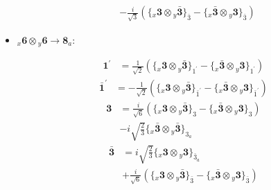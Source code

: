 \documentclass[english]{article}
\newcommand{\rep}[1]{\mathbf{#1}}
\newcommand{\repx}[2]{{}_{#2}\mathbf{#1}}
\newcommand{\tsprodx}[2]{\repx{#1}{x}\otimes\repx{#2}{y}}
\newcommand{\subcgt}[3]{\big\{ \tsprodx{#1}{#2}\big\}^{}_{#3}}
\begin{document}
\begin{itemize}
\begin{fleqn}
\begin{align*}
 & -\frac{i}{\sqrt{3}}\left(\subcgt{3}{\bar{3}}{\bar{3}}-\subcgt{\bar{3}}{3}{\bar{3}}\right)
\end{align*}
\end{fleqn}
\item $\tsprodx{6}{6}\to\rep{8}_{a}$:
\begin{fleqn}
\begin{align*}
\rep{1^{\prime}} & = \frac{1}{\sqrt{2}}\left(\subcgt{3}{\bar{3}}{1^{\prime}}-\subcgt{\bar{3}}{3}{1^{\prime}}\right)
\end{align*}
\begin{align*}
\rep{\bar{1}^{\prime}} & = -\frac{1}{\sqrt{2}}\left(\subcgt{3}{\bar{3}}{\bar{1}^{\prime}}-\subcgt{\bar{3}}{3}{\bar{1}^{\prime}}\right)
\end{align*}
\begin{align*}
\rep{3} & = \frac{i}{\sqrt{6}}\left(\subcgt{3}{\bar{3}}{3}-\subcgt{\bar{3}}{3}{3}\right) \\ 
 & -i \sqrt{\frac{2}{3}}\subcgt{\bar{3}}{\bar{3}}{3_{a}}
\end{align*}
\begin{align*}
\rep{\bar{3}} & = i \sqrt{\frac{2}{3}}\subcgt{3}{3}{\bar{3}_{a}} \\ 
 & +\frac{i}{\sqrt{6}}\left(\subcgt{3}{\bar{3}}{\bar{3}}-\subcgt{\bar{3}}{3}{\bar{3}}\right)
\end{align*}
\end{fleqn}
\end{itemize}
\end{document}
